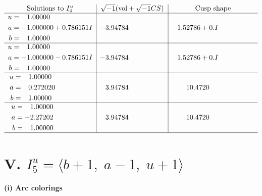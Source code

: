 \documentclass[1p]{elsarticle_modified}
\theoremstyle{definition}
\newcommand{\I}{\sqrt{-1}}
\begin{document}
$$\begin{array}{c|c|c}  
\text{Solutions to }I^u_{4}& \I (\text{vol} + \sqrt{-1}CS) & \text{Cusp shape}\\
 \hline 
\begin{aligned}
u &= \phantom{-}1.00000\phantom{ +0.000000I} \\
a &= -1.000000 + 0.786151 I \\
b &= \phantom{-}1.00000\phantom{ +0.000000I}\end{aligned}
 & -3.94784\phantom{ +0.000000I} & \phantom{-}1.52786 + 0. I\phantom{ +0.000000I} \\ \hline\begin{aligned}
u &= \phantom{-}1.00000\phantom{ +0.000000I} \\
a &= -1.000000 - 0.786151 I \\
b &= \phantom{-}1.00000\phantom{ +0.000000I}\end{aligned}
 & -3.94784\phantom{ +0.000000I} & \phantom{-}1.52786 + 0. I\phantom{ +0.000000I} \\ \hline\begin{aligned}
u &= \phantom{-}1.00000\phantom{ +0.000000I} \\
a &= \phantom{-}0.272020\phantom{ +0.000000I} \\
b &= \phantom{-}1.00000\phantom{ +0.000000I}\end{aligned}
 & \phantom{-}3.94784\phantom{ +0.000000I} & \phantom{-}10.4720\phantom{ +0.000000I} \\ \hline\begin{aligned}
u &= \phantom{-}1.00000\phantom{ +0.000000I} \\
a &= -2.27202\phantom{ +0.000000I} \\
b &= \phantom{-}1.00000\phantom{ +0.000000I}\end{aligned}
 & \phantom{-}3.94784\phantom{ +0.000000I} & \phantom{-}10.4720\phantom{ +0.000000I}\\
 \hline 
 \end{array}$$\newpage\newpage\renewcommand{\arraystretch}{1}
\centering \section*{V. $I^u_{5}= \langle b+1,\;a-1,\;u+1 \rangle$}
\flushleft \textbf{(i) Arc colorings}\\
\end{document}
